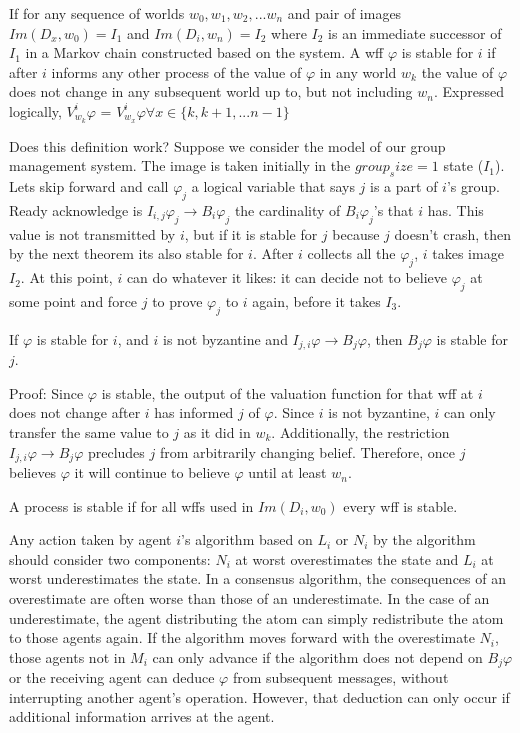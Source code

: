 \begin{pdef}
If for any sequence of worlds $w_0, w_1, w_2, ... w_n$ and pair of images $Im(D_x, w_0)=I_1$ and $Im(D_i, w_n)=I_2$ where $I_2$ is an immediate successor of $I_1$ in a Markov chain constructed based on the system. A wff $\varphi$ is stable for $i$ if after $i$ informs any other process of the value of $\varphi$ in any world $w_k$ the value of $\varphi$ does not change in any subsequent world up to, but not including $w_n$. Expressed logically, $V^i_{w_k} \varphi$ = $V^i_{w_x} \varphi \forall x \in \{k, k+1, ... n-1\}$
\end{pdef}

Does this definition work? Suppose we consider the model of our group management system. The image is taken initially in the $group_size=1$ state ($I_1$). Lets skip forward and call $\varphi_j$ a logical variable that says $j$ is a part of $i$'s group. Ready acknowledge is $I_{i,j} \varphi_j \rightarrow B_i \varphi_j$ the cardinality of $B_i \varphi_j$'s that $i$ has. This value is not transmitted by $i$, but if it is stable for $j$ because $j$ doesn't crash, then by the next theorem its also stable for $i$. After $i$ collects all the $\varphi_j$, $i$ takes image $I_2$. At this point, $i$ can do whatever it likes: it can decide not to believe $\varphi_j$ at some point and force $j$ to prove $\varphi_j$ to $i$ again, before it takes $I_3$.

\begin{thm}
If $\varphi$ is stable for $i$, and $i$ is not byzantine and $I_{j,i} \varphi \rightarrow B_j \varphi$, then $B_j \varphi$ is stable for $j$.
\end{thm}

Proof: Since $\varphi$ is stable, the output of the valuation function for that wff at $i$ does not change after $i$ has informed $j$ of $\varphi$. Since $i$ is not byzantine, $i$ can only transfer the same value to $j$ as it did in $w_k$. Additionally, the restriction $I_{j,i} \varphi \rightarrow B_j \varphi$ precludes $j$ from arbitrarily changing belief. Therefore, once $j$ believes $\varphi$ it will continue to believe $\varphi$ until at least $w_n$.

\begin{pdef}
A process is stable if for all wffs used in $Im(D_i, w_0)$ every wff is stable.
\end{pdef}

Any action taken by agent $i$'s algorithm based on $L_i$ or $N_i$ by the algorithm should consider two components: $N_i$ at worst overestimates the state and $L_i$ at worst underestimates the state. In a consensus algorithm, the consequences of an overestimate are often worse than those of an underestimate. In the case of an underestimate, the agent distributing the atom can simply redistribute the atom to those agents again. If the algorithm moves forward with the overestimate $N_i$, those agents not in $M_i$ can only advance if the algorithm does not depend on $B_j \varphi$ or the receiving agent can deduce $\varphi$ from subsequent messages, without interrupting another agent's operation. However, that deduction can only occur if additional information arrives at the agent.

